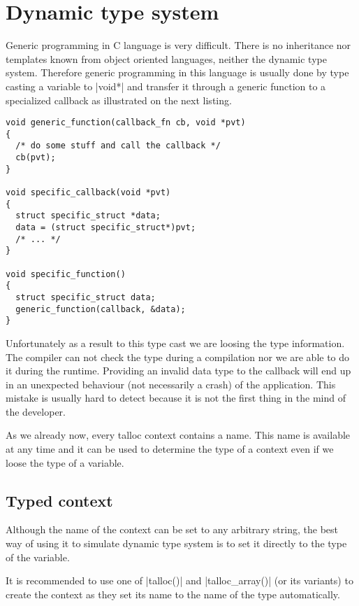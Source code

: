 \section{Dynamic type system}
\label{talloc:dyn-ts}

Generic programming in C language is very difficult. There is no inheritance nor
templates known from object oriented languages, neither the dynamic type system.
Therefore generic programming in this language is usually done by type casting a
variable to |void*| and transfer it through a generic function to a specialized
callback as illustrated on the next listing.

\begin{lstlisting}[caption={Generic programming pattern},label=lst-generic-prg]
void generic_function(callback_fn cb, void *pvt)
{
  /* do some stuff and call the callback */
  cb(pvt);
}

void specific_callback(void *pvt)
{
  struct specific_struct *data;
  data = (struct specific_struct*)pvt;
  /* ... */
}

void specific_function()
{
  struct specific_struct data;
  generic_function(callback, &data);
}
\end{lstlisting}

Unfortunately as a result to this type cast we are loosing the type information.
The compiler can not check the type during a compilation nor we are able to do
it during the runtime. Providing an invalid data type to the callback will end
up in an unexpected behaviour (not necessarily a crash) of the application.
This mistake is usually hard to detect because it is not the first thing in the
mind of the developer.

As we already now, every talloc context contains a name. This name is available
at any time and it can be used to determine the type of a context even if we
loose the type of a variable.

\subsection{Typed context}

Although the name of the context can be set to any arbitrary string, the best
way of using it to simulate dynamic type system is to set it directly to the
type of the variable.

It is recommended to use one of |talloc()| and |talloc_array()| (or its
variants) to create the context as they set its name to the name of the type
automatically.

